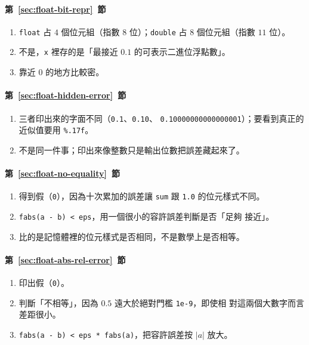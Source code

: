 \paragraph{第~\ref{sec:float-bit-repr}~節}
\begin{enumerate}
\item \texttt{float} 占 $4$ 個位元組（指數 $8$ 位）；\texttt{double}
占 $8$ 個位元組（指數 $11$ 位）。
\item 不是，\texttt{x} 裡存的是「最接近 $0.1$ 的可表示二進位浮點數」。
\item 靠近 $0$ 的地方比較密。
\end{enumerate}

\paragraph{第~\ref{sec:float-hidden-error}~節}
\begin{enumerate}
\item 三者印出來的字面不同（\texttt{0.1}、\texttt{0.10}、
\texttt{0.10000000000000001}）；要看到真正的近似值要用
\texttt{\%.17f}。
\item 不是同一件事；印出來像整數只是輸出位數把誤差藏起來了。
\end{enumerate}

\paragraph{第~\ref{sec:float-no-equality}~節}
\begin{enumerate}
\item 得到假（\texttt{0}），因為十次累加的誤差讓 \texttt{sum} 跟
\texttt{1.0} 的位元樣式不同。
\item \texttt{fabs(a - b) < eps}，用一個很小的容許誤差判斷是否「足夠
接近」。
\item 比的是記憶體裡的位元樣式是否相同，不是數學上是否相等。
\end{enumerate}

\paragraph{第~\ref{sec:float-abs-rel-error}~節}
\begin{enumerate}
\item 印出假（\texttt{0}）。
\item 判斷「不相等」，因為 $0.5$ 遠大於絕對門檻 \texttt{1e-9}，即使相
對這兩個大數字而言差距很小。
\item \texttt{fabs(a - b) < eps * fabs(a)}，把容許誤差按 $|a|$ 放大。
\end{enumerate}

